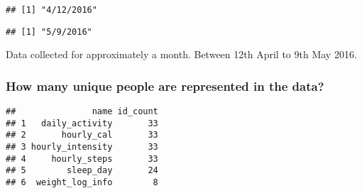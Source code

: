 \documentclass[
]{article}
\newenvironment{Shaded}{\begin{snugshade}}{\end{snugshade}}
\newcommand{\AttributeTok}[1]{\textcolor[rgb]{0.77,0.63,0.00}{#1}}
\newcommand{\CommentTok}[1]{\textcolor[rgb]{0.56,0.35,0.01}{\textit{#1}}}
\newcommand{\FunctionTok}[1]{\textcolor[rgb]{0.00,0.00,0.00}{#1}}
\newcommand{\NormalTok}[1]{#1}
\newcommand{\OtherTok}[1]{\textcolor[rgb]{0.56,0.35,0.01}{#1}}
\newcommand{\SpecialCharTok}[1]{\textcolor[rgb]{0.00,0.00,0.00}{#1}}
\newcommand{\StringTok}[1]{\textcolor[rgb]{0.31,0.60,0.02}{#1}}
\begin{document}
\begin{verbatim}
## [1] "4/12/2016"
\end{verbatim}

\begin{Shaded}
\end{Shaded}

\begin{verbatim}
## [1] "5/9/2016"
\end{verbatim}

Data collected for approximately a month. Between 12th April to 9th May
2016.

\hypertarget{how-many-unique-people-are-represented-in-the-data}{%
\subsubsection{How many unique people are represented in the
data?}\label{how-many-unique-people-are-represented-in-the-data}}

\begin{Shaded}
\end{Shaded}

\begin{verbatim}
##               name id_count
## 1   daily_activity       33
## 2       hourly_cal       33
## 3 hourly_intensity       33
## 4     hourly_steps       33
## 5        sleep_day       24
## 6  weight_log_info        8
\end{verbatim}
\end{document}
